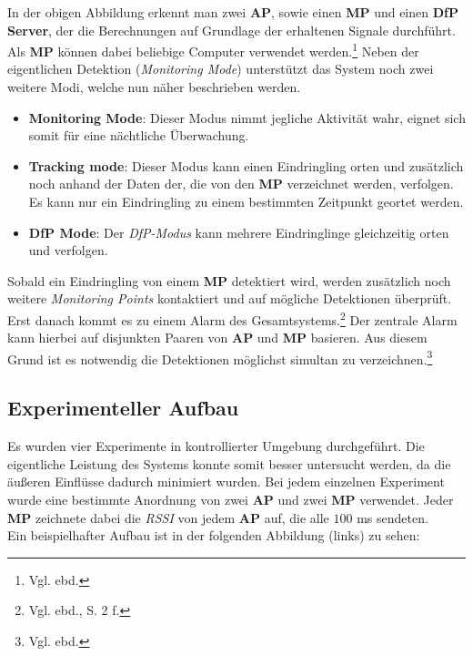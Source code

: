 In der obigen Abbildung erkennt man zwei \textbf{AP}, sowie einen \textbf{MP} und einen \textbf{DfP Server}, der die Berechnungen auf Grundlage der erhaltenen Signale durchführt. Als \textbf{MP} können dabei beliebige Computer verwendet werden.\footnote{Vgl. ebd.} Neben der eigentlichen Detektion (\textit{Monitoring Mode}) unterstützt das System noch zwei weitere Modi, welche nun näher beschrieben werden.\\

\begin{itemize}
\item \textbf{Monitoring Mode}: Dieser Modus nimmt jegliche Aktivität wahr, eignet sich somit für eine nächtliche Überwachung.
\item \textbf{Tracking mode}: Dieser Modus kann einen Eindringling orten und zusätzlich noch anhand der Daten der, die von den \textbf{MP} verzeichnet werden, verfolgen. Es kann nur ein Eindringling zu einem bestimmten Zeitpunkt geortet werden.
\item \textbf{DfP Mode}: Der \textit{DfP-Modus} kann mehrere Eindringlinge gleichzeitig orten und verfolgen.
\end{itemize}

Sobald ein Eindringling von einem \textbf{MP} detektiert wird, werden zusätzlich noch weitere \textit{Monitoring Points} kontaktiert und auf mögliche Detektionen überprüft. Erst danach kommt es zu einem Alarm des Gesamtsystems.\footnote{Vgl. ebd., S. 2 f.} Der zentrale Alarm kann hierbei auf disjunkten Paaren von \textbf{AP} und \textbf{MP} basieren. Aus diesem Grund ist es notwendig die Detektionen möglichst simultan zu verzeichnen.\footnote{Vgl. ebd.}

\subsection{Experimenteller Aufbau}
Es wurden vier Experimente in kontrollierter Umgebung durchgeführt. Die eigentliche Leistung des Systems konnte somit besser untersucht werden, da die äußeren Einflüsse dadurch minimiert wurden. Bei jedem einzelnen Experiment wurde eine bestimmte Anordnung von zwei \textbf{AP} und zwei \textbf{MP} verwendet. Jeder \textbf{MP} zeichnete dabei die \textit{RSSI} von jedem \textbf{AP} auf, die alle $100$ ms sendeten.\\
Ein beispielhafter Aufbau ist in der folgenden Abbildung (links) zu sehen:

